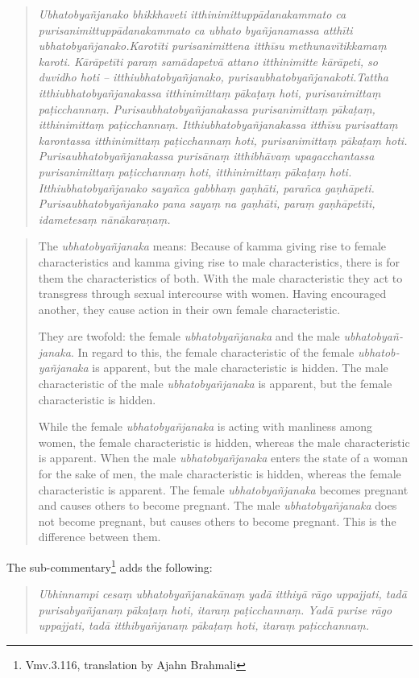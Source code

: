 \begin{quote}
{\em Ubhatobyañjanako bhikkhaveti itthinimittuppādanakammato ca purisanimittuppādanakammato ca ubhato byañjanamassa atthīti ubhatobyañjanako.Karotīti purisanimittena itthīsu methunavītikkamaṃ karoti. Kārāpetīti paraṃ samādapetvā attano itthinimitte kārāpeti, so duvidho hoti – itthiubhatobyañjanako, purisaubhatobyañjanakoti.Tattha itthiubhatobyañjanakassa itthinimittaṃ pākaṭaṃ hoti, purisanimittaṃ paṭicchannaṃ. Purisaubhatobyañjanakassa purisanimittaṃ pākaṭaṃ, itthinimittaṃ paṭicchannaṃ. Itthiubhatobyañjanakassa itthīsu purisattaṃ karontassa itthinimittaṃ paṭicchannaṃ hoti, purisanimittaṃ pākaṭaṃ hoti. Purisaubhatobyañjanakassa purisānaṃ itthibhāvaṃ upagacchantassa purisanimittaṃ paṭicchannaṃ hoti, itthinimittaṃ pākaṭaṃ hoti. Itthiubhatobyañjanako sayañca gabbhaṃ gaṇhāti, parañca gaṇhāpeti. Purisaubhatobyañjanako pana sayaṃ na gaṇhāti, paraṃ gaṇhāpetīti, idametesaṃ nānākaraṇaṃ.}
\end{quote}

\begin{quote}
The {\em ubhatob­yañ­janaka} means: Because of kamma giving rise to female characteristics and kamma giving rise to male characteristics, there is for them the characteristics of both. With the male characteristic they act to transgress through sexual intercourse with women. Having encouraged another, they cause action in their own female characteristic. 

They are twofold: the female {\em ubhatob­yañ­janaka} and the male {\em ubhatob­yañ­janaka}. In regard to this, the female characteristic of the female {\em ubhatob­yañ­janaka} is apparent, but the male characteristic is hidden. The male characteristic of the male {\em ubhatob­yañ­janaka} is apparent, but the female characteristic is hidden. 

While the female {\em ubhatob­yañ­janaka} is acting with manliness among women, the female characteristic is hidden, whereas the male characteristic is apparent. 
When the male {\em ubhatob­yañ­janaka} enters the state of a woman for the sake of men, the male characteristic is hidden, whereas the female characteristic is apparent. 
The female {\em ubhatob­yañ­janaka} becomes pregnant and causes others to become pregnant. The male {\em ubhatob­yañ­janaka} does not become pregnant, but causes others to become pregnant. This is the difference between them.
\end{quote}

The sub-commentary\footnote{Vmv.3.116, translation by Ajahn Brahmali} adds the following: 
\begin{quote}
{\em Ubhinnampi cesaṃ ubhatobyañjanakānaṃ yadā itthiyā rāgo uppajjati, tadā purisabyañjanaṃ pākaṭaṃ hoti, itaraṃ paṭicchannaṃ. Yadā purise rāgo uppajjati, tadā itthibyañjanaṃ pākaṭaṃ hoti, itaraṃ paṭicchannaṃ.}
\end{quote}

